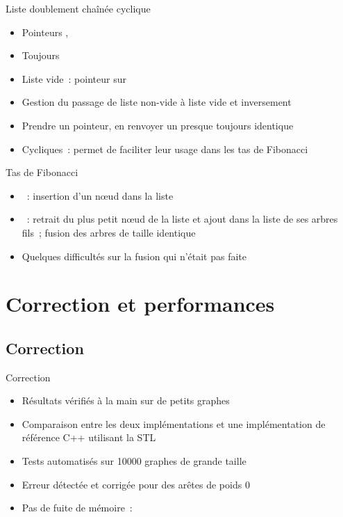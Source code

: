 \documentclass[11pt]{beamer}
\begin{document}
\begin{frame}{Liste doublement chaînée cyclique}
\begin{itemize}
\item Pointeurs , 
\item Toujours 
\item Liste vide~: pointeur sur 
\item Gestion du passage de liste non-vide à liste vide et inversement
\item Prendre un pointeur, en renvoyer un presque toujours identique
\item Cycliques~: permet de faciliter leur usage dans les tas de Fibonacci
\end{itemize}
\end{frame}

\begin{frame}{Tas de Fibonacci}
\begin{itemize}
\item {}~: insertion d'un n\oe ud dans la liste
\item {}~: retrait du plus petit n\oe ud de la liste et ajout dans la liste de ses arbres fils~; fusion des arbres de taille identique
\item Quelques difficultés sur la fusion qui n'était pas faite
\end{itemize}
\end{frame}

\section{Correction et performances}

\subsection{Correction}

\begin{frame}{Correction}
\begin{itemize}
\item Résultats vérifiés à la main sur de petits graphes
\item Comparaison entre les deux implémentations et une implémentation de référence C++ utilisant la STL
\item Tests automatisés sur 10000 graphes de grande taille
\item Erreur détectée et corrigée pour des arêtes de poids 0
\item Pas de fuite de mémoire~: 
\end{itemize}
\end{frame}
\end{document}
